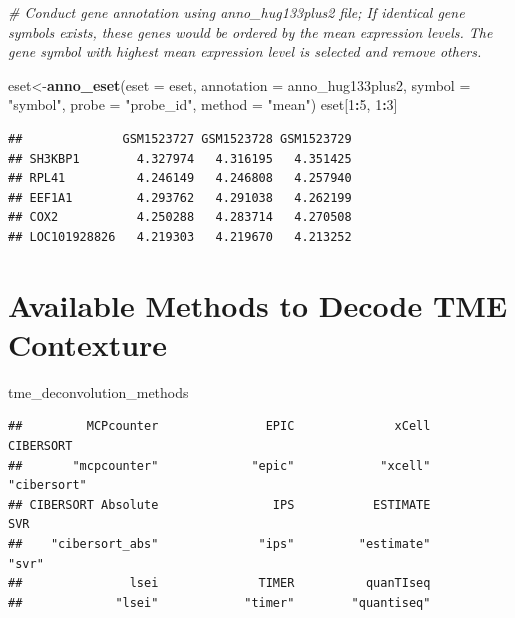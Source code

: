 \documentclass[
  12pt,
]{book}
\newenvironment{Shaded}{\begin{snugshade}}{\end{snugshade}}
\newcommand{\AttributeTok}[1]{\textcolor[rgb]{0.13,0.29,0.53}{#1}}
\newcommand{\CommentTok}[1]{\textcolor[rgb]{0.56,0.35,0.01}{\textit{#1}}}
\newcommand{\DecValTok}[1]{\textcolor[rgb]{0.00,0.00,0.81}{#1}}
\newcommand{\FunctionTok}[1]{\textcolor[rgb]{0.13,0.29,0.53}{\textbf{#1}}}
\newcommand{\NormalTok}[1]{#1}
\newcommand{\OtherTok}[1]{\textcolor[rgb]{0.56,0.35,0.01}{#1}}
\newcommand{\SpecialCharTok}[1]{\textcolor[rgb]{0.81,0.36,0.00}{\textbf{#1}}}
\newcommand{\StringTok}[1]{\textcolor[rgb]{0.31,0.60,0.02}{#1}}
\theoremstyle{definition}
\theoremstyle{definition}
\theoremstyle{definition}
\theoremstyle{definition}
\theoremstyle{remark}
\begin{document}
\begin{Shaded}
\begin{Highlighting}[]
\CommentTok{\# Conduct gene annotation using \textasciigrave{}anno\_hug133plus2\textasciigrave{} file; If identical gene symbols exists, these genes would be ordered by the mean expression levels. The gene symbol with highest mean expression level is selected and remove others. }

\NormalTok{eset}\OtherTok{\textless{}{-}}\FunctionTok{anno\_eset}\NormalTok{(}\AttributeTok{eset       =}\NormalTok{ eset,}
                \AttributeTok{annotation =}\NormalTok{ anno\_hug133plus2,}
                \AttributeTok{symbol     =} \StringTok{"symbol"}\NormalTok{,}
                \AttributeTok{probe      =} \StringTok{"probe\_id"}\NormalTok{,}
                \AttributeTok{method     =} \StringTok{"mean"}\NormalTok{)}
\NormalTok{eset[}\DecValTok{1}\SpecialCharTok{:}\DecValTok{5}\NormalTok{, }\DecValTok{1}\SpecialCharTok{:}\DecValTok{3}\NormalTok{]}
\end{Highlighting}
\end{Shaded}

\begin{verbatim}
##              GSM1523727 GSM1523728 GSM1523729
## SH3KBP1        4.327974   4.316195   4.351425
## RPL41          4.246149   4.246808   4.257940
## EEF1A1         4.293762   4.291038   4.262199
## COX2           4.250288   4.283714   4.270508
## LOC101928826   4.219303   4.219670   4.213252
\end{verbatim}

\hypertarget{available-methods-to-decode-tme-contexture}{%
\section{Available Methods to Decode TME Contexture}\label{available-methods-to-decode-tme-contexture}}

\begin{Shaded}
\begin{Highlighting}[]
\NormalTok{tme\_deconvolution\_methods}
\end{Highlighting}
\end{Shaded}

\begin{verbatim}
##         MCPcounter               EPIC              xCell          CIBERSORT 
##       "mcpcounter"             "epic"            "xcell"        "cibersort" 
## CIBERSORT Absolute                IPS           ESTIMATE                SVR 
##    "cibersort_abs"              "ips"         "estimate"              "svr" 
##               lsei              TIMER          quanTIseq 
##             "lsei"            "timer"        "quantiseq"
\end{verbatim}
\end{document}
